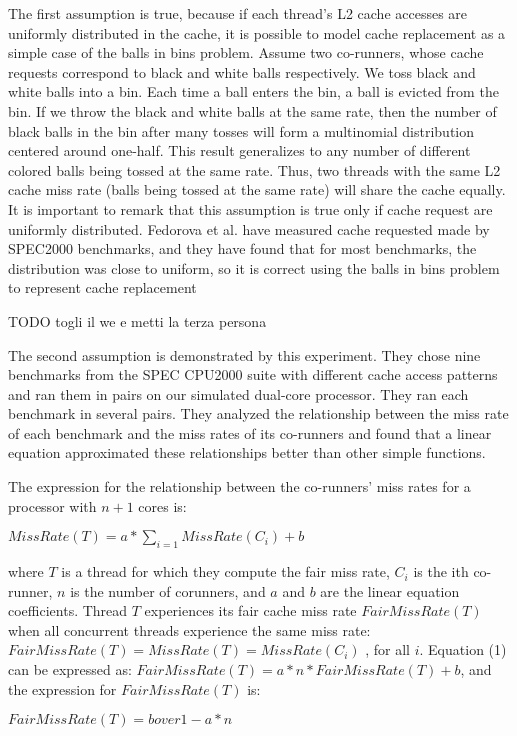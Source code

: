 \documentclass[a4paper,10pt]{article}
\begin{document}
\begin{multicols}{2}
The first assumption is true, because if each thread's L2 cache accesses are uniformly distributed in the cache, it is possible to model cache 
replacement as a simple case of the balls in bins problem. 
Assume two co-runners, whose cache requests correspond to black and white balls respectively.
We toss black and white balls into a bin. Each time a ball enters the bin, a ball is evicted from
the bin. If we throw the black and white balls at the same rate, then the number of black balls in the bin after many tosses will form a 
multinomial distribution centered around one-half. This result generalizes to any number of different colored balls being tossed at
the same rate. Thus, two threads with the same L2 cache miss rate (balls being tossed at the same rate) will share the cache equally. 
It is important to remark that this assumption is true only if cache request are uniformly distributed. Fedorova et al. have measured cache requested 
made by SPEC2000 benchmarks, and they have found that for most benchmarks, the distribution was close to uniform, so it is correct using the balls in bins
problem to represent cache replacement

TODO togli il we e metti la terza persona

The second assumption is demonstrated by this experiment.
They chose nine benchmarks from the SPEC CPU2000 suite with different cache access patterns and ran them in pairs on our simulated dual-core processor. 
They ran each benchmark in several pairs. They analyzed the relationship between the miss rate of each benchmark and the miss rates of its co-runners and 
found that a linear equation approximated these relationships better than other simple functions.

The expression for the relationship between the co-runners' miss rates for a processor with $n+1$ cores is:

	$MissRate(T) = a*\sum_{i=1} MissRate(C_{i}) + b$

where $T$ is a thread for which they compute the fair miss rate, $C_i$ is the ith co-runner, $n$ is the number of corunners, and $a$ and $b$ are the 
linear equation coefficients. Thread $T$ experiences its fair cache miss rate $FairMissRate(T)$ when all concurrent threads experience the same 
miss rate:
$FairMissRate(T) = MissRate(T) = MissRate(C_i)$ , for all $i$. Equation (1) can be expressed as: $FairMissRate(T ) = a* n* FairMissRate(T ) + b$,
and the expression for $FairMissRate(T)$ is:

	$FairMissRate(T) = b over 1 - a*n$


\end{multicols}
\end{document}
